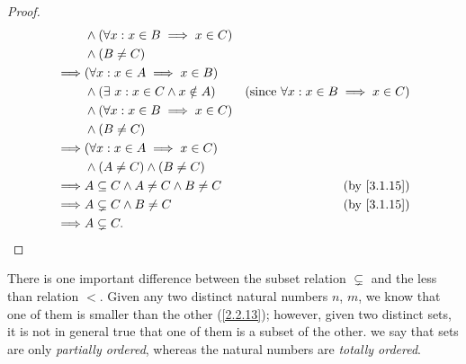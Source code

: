 \begin{proof}
\begin{align*}
             & \land (\forall x : x \in B \implies x \in C)                                                                                              \\
             & \land (B \neq C)                                                                                                                          \\
    \implies & (\forall x : x \in A \implies x \in B)                                                                                                    \\
             & \land (\exists\ x : x \in C \land x \notin A)                                   & \text{(since \(\forall x : x \in B \implies x \in C\))} \\
             & \land (\forall x : x \in B \implies x \in C)                                                                                              \\
             & \land (B \neq C)                                                                                                                          \\
    \implies & (\forall x : x \in A \implies x \in C)                                                                                                    \\
             & \land (A \neq C) \land (B \neq C)                                                                                                         \\
    \implies & A \subseteq C \land A \neq C \land B \neq C                                     & \text{(by \cref{3.1.15})}                               \\
    \implies & A \subsetneq C \land B \neq C                                                   & \text{(by \cref{3.1.15})}                               \\
    \implies & A \subsetneq C.
  \end{align*}
\end{proof}

\setcounter{thm}{19}
\begin{rmk}\label{3.1.20}
  There is one important difference between the subset relation \(\subsetneq\) and the less than relation \(<\).
  Given any two distinct natural numbers \(n\), \(m\), we know that one of them is smaller than the other (\cref{2.2.13});
  however, given two distinct sets, it is not in general true that one of them is a subset of the other.
  we say that sets are only \emph{partially ordered}, whereas the natural numbers are \emph{totally ordered}.
\end{rmk}

